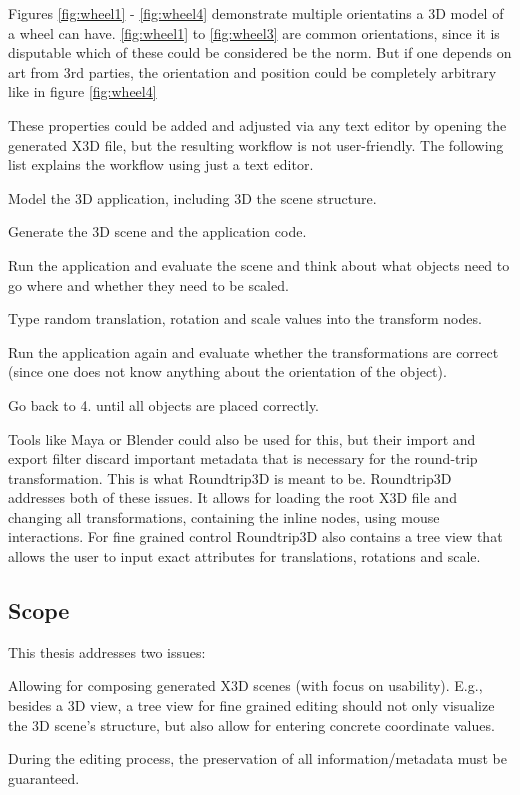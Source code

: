 Figures \ref{fig:wheel1} - \ref{fig:wheel4} demonstrate multiple orientatins a \gls{3D} model of a wheel can have. \ref{fig:wheel1} to \ref{fig:wheel3} are common
orientations, since it is disputable which of these could be considered be the
norm. But if one depends on art from 3rd parties, the orientation and position
could be completely arbitrary like in figure \ref{fig:wheel4}

These properties could be added and adjusted via any text editor by opening the
generated \gls{X3D} file, but the resulting workflow is not user-friendly. The
following list explains the workflow using just a text editor.

\begin{enumerate*}
  \item Model the \gls{3D} application, including \gls{3D} the scene structure.
  \item Generate the \gls{3D} scene and the application code.
  \item Run the application and evaluate the scene and think about what objects need to go where and whether they need to be scaled.
  \item Type random translation, rotation and scale values into the transform nodes.
  \item Run the application again and evaluate whether the transformations are correct (since one does not know anything about the orientation of the object).
  \item Go back to 4. until all objects are placed correctly.
\end{enumerate*}

Tools like Maya or Blender could also be used for this, but their import
and export filter discard important metadata that is necessary for the
round-trip transformation. This is what \gls{Roundtrip3D} is meant to be. \gls{Roundtrip3D} addresses both of these issues. It allows for loading the root \gls{X3D} file and changing all transformations, containing the inline nodes,
using mouse interactions. For fine grained control \gls{Roundtrip3D} also
contains a tree view that allows the user to input exact attributes for
translations, rotations and scale.

\subsection{Scope}\label{scope}

This thesis addresses two issues:

\begin{enumerate*}
  \item Allowing for composing generated \gls{X3D} scenes (with focus on usability). E.g., besides a \gls{3D} view, a tree view for fine grained editing should not only visualize the \gls{3D} scene's structure, but also allow for entering concrete coordinate values.
  \item During the editing process, the preservation of all information/metadata must be guaranteed.
\end{enumerate*}
